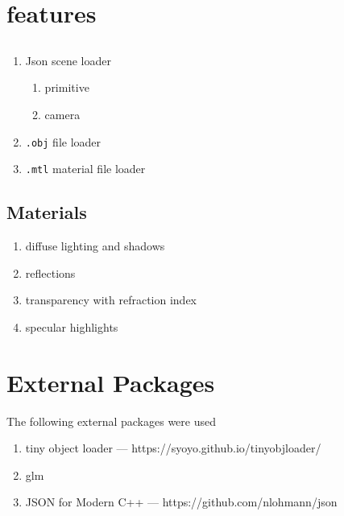 \section{features}

\subsection{}
    \begin{enumerate}
    \item Json scene loader
        \begin{enumerate}
        \item primitive
        \item camera
        \end{enumerate}
    \item \verb|.obj| file loader
    \item \verb|.mtl| material file loader
    \end{enumerate}

\subsection{Materials}
    \begin{enumerate}
    \item diffuse lighting and shadows
    \item reflections
    \item transparency with refraction index
    \item specular highlights
    \end{enumerate}

\section{External Packages}
The following external packages were used 
\begin{enumerate}
    \item tiny object loader --- https://syoyo.github.io/tinyobjloader/
    \item glm
    \item JSON for Modern C++ --- https://github.com/nlohmann/json
\end{enumerate}

